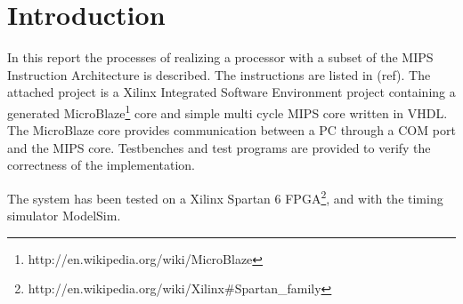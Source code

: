 \section{Introduction}

In this report the processes of realizing a processor with a subset of 
the MIPS Instruction Architecture is described. The instructions are listed 
in (ref). The attached project is a Xilinx Integrated Software Environment 
project containing a generated MicroBlaze\footnote{http://en.wikipedia.org/wiki/MicroBlaze} 
core and simple multi cycle MIPS core written in VHDL. The MicroBlaze core provides 
communication between a PC through a COM port and the MIPS core. Testbenches and 
test programs are provided to verify the correctness of the implementation. 

The system has been tested on a Xilinx Spartan 6 FPGA\footnote{http://en.wikipedia.org/wiki/Xilinx\#Spartan\_family}, 
and with the timing simulator ModelSim.
